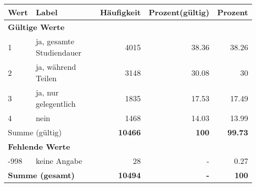      \begin{longtable}{lXrrr}
     \toprule
     \textbf{Wert} & \textbf{Label} & \textbf{Häufigkeit} & \textbf{Prozent(gültig)} & \textbf{Prozent} \\
     \endhead
     \midrule
     \multicolumn{5}{l}{\textbf{Gültige Werte}}\\

     1 &
     \multicolumn{1}{X}{ ja, gesamte Studiendauer   } &


       \num{4015} &
       \num[round-mode=places,round-precision=2]{38.36} &
         \num[round-mode=places,round-precision=2]{38.26} \\

     2 &
     \multicolumn{1}{X}{ ja, während Teilen   } &


       \num{3148} &
       \num[round-mode=places,round-precision=2]{30.08} &
         \num[round-mode=places,round-precision=2]{30} \\

     3 &
     \multicolumn{1}{X}{ ja, nur gelegentlich   } &


       \num{1835} &
       \num[round-mode=places,round-precision=2]{17.53} &
         \num[round-mode=places,round-precision=2]{17.49} \\

     4 &
     \multicolumn{1}{X}{ nein   } &


       \num{1468} &
       \num[round-mode=places,round-precision=2]{14.03} &
         \num[round-mode=places,round-precision=2]{13.99} \\
     \midrule
     \multicolumn{2}{l}{Summe (gültig)} &
       \textbf{\num{10466}} &
     \textbf{\num{100}} &
       \textbf{\num[round-mode=places,round-precision=2]{99.73}} \\
     \multicolumn{5}{l}{\textbf{Fehlende Werte}}\\
       -998 &
       keine Angabe &
         \num{28} &
        - &
         \num[round-mode=places,round-precision=2]{0.27} \\
     \midrule
     \multicolumn{2}{l}{\textbf{Summe (gesamt)}} &
          \textbf{\num{10494}} &
        \textbf{-} &
        \textbf{\num{100}} \\
     \bottomrule
     \end{longtable}
     
